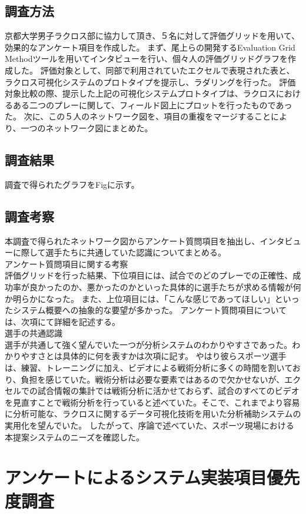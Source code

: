 \documentclass[sotsuron]{kuee}
\begin{document}
\subsection{調査方法}
京都大学男子ラクロス部に協力して頂き、５名に対して評価グリッドを用いて、効果的なアンケート項目を作成した。
まず、尾上らの開発するEvaluation Grid Methodツールを用いてインタビューを行い、個々人の評価グリッドグラフを作成した。
評価対象として、同部で利用されていたエクセルで表現された表と、ラクロス可視化システムのプロトタイプを提示し、ラダリングを行った。
評価対象比較の際、提示した上記の可視化システムプロトタイプは、ラクロスにおけるある二つのプレーに関して、フィールド図上にプロットを行ったものであった。
次に、この５人のネットワーク図を、項目の重複をマージすることにより、一つのネットワーク図にまとめた。
\subsection{調査結果}
調査で得られたグラフをFigに示す。
\subsection{調査考察}
本調査で得られたネットワーク図からアンケート質問項目を抽出し、インタビューに際して選手たちに共通していた認識についてまとめる。
\\アンケート質問項目に関する考察
\\評価グリッドを行った結果、下位項目には、試合でのどのプレーでの正確性、成功率が良かったのか、悪かったのかといった具体的に選手たちが求める情報が何か明らかになった。
また、上位項目には、「こんな感じであってほしい」といったシステム概要への抽象的な要望が多かった。
アンケート質問項目については、次項にて詳細を記述する。
\\選手の共通認識
\\選手が共通して強く望んでいた一つが分析システムのわかりやすさであった。わかりやすさとは具体的に何を表すかは次項に記す。
やはり彼らスポーツ選手は、練習、トレーニングに加え、ビデオによる戦術分析に多くの時間を割いており、負担を感じていた。戦術分析は必要な要素ではあるので欠かせないが、エクセルでの試合情報の集計では戦術分析に活かせておらず、試合のすべてのビデオを見直すことで戦術分析を行っていると述べていた。そこで、これまでより容易に分析可能な、ラクロスに関するデータ可視化技術を用いた分析補助システムの実用化を望んでいた。
したがって、序論で述べていた、スポーツ現場における本提案システムのニーズを確認した。

\section{アンケートによるシステム実装項目優先度調査}
\end{document}
